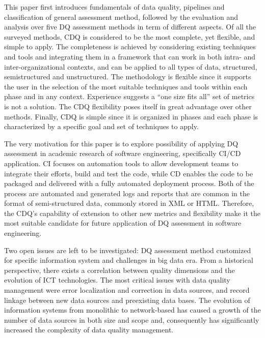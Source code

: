 \documentclass[pdftex,english,oribibl]{llncs}
\begin{document}
This paper first introduces fundamentals of data quality, pipelines and classification of general assessment method, followed by the evaluation and analysis over five DQ assessment methods in term of different aspects.
Of all the surveyed methods, CDQ is considered to be the most complete, yet flexible, and simple to apply.
The completeness is achieved by considering existing techniques and tools and integrating them in a framework that can work in both intra- and inter-organizational contexts, and can be applied to all types of data, structured, semistructured and unstructured.
The methodology is flexible since it supports the user in the selection of the most suitable techniques and tools within each phase and in any context.
Experience suggests a “one size fits all” set of metrics is not a solution. The CDQ flexibility poses itself in great advantage over other methods.
Finally, CDQ is simple since it is organized in phases and each phase is characterized by a specific goal and set of techniques to apply.

The very motivation for this paper is to explore possibility of applying DQ assessment in academic research of software engineering, specifically CI/CD application. CI focuses on automation tools to allow development teams to integrate their efforts, build and test the code, while CD enables the code to be packaged and delivered with a fully automated deployment process. Both of the process are automated and generated logs and reports that are common in the format of semi-structured data, commonly stored in XML or HTML.
Therefore, the CDQ's capability of extension to other new metrics and flexibility make it the most suitable candidate for future application of DQ assessment in software engineering.

Two open issues are left to be investigated: DQ assessment method customized for specific information system and challenges in big data era.
From a historical perspective, there exists a correlation between quality dimensions and the evolution of ICT technologies.
The most critical issues with data quality management were error localization and correction in data sources, and record linkage between new data sources and preexisting data bases.
The evolution of information systems from monolithic to network-based has caused a growth of the number of data sources in both size and scope and, consequently has significantly increased the complexity of data quality management.
\end{document}

